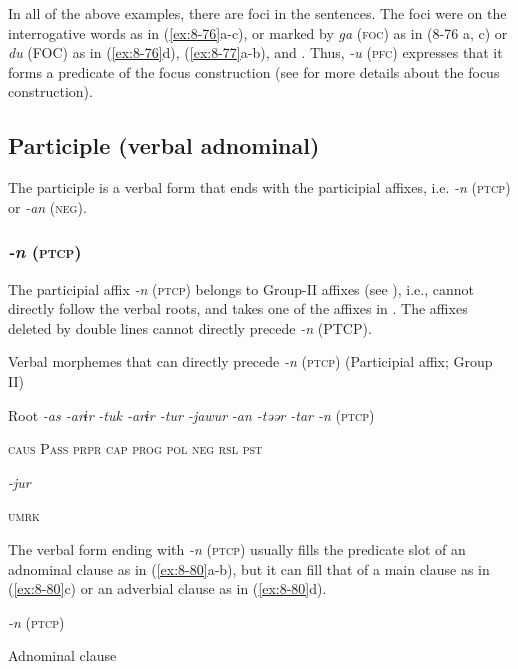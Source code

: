   In all of the above examples, there are foci in the sentences. The foci were on the interrogative words as in (\ref{ex:8-76}a-c), or marked by \textit{ga} (\textsc{foc}) as in (8-76 a, c) or \textit{du} (FOC) as in (\ref{ex:8-76}d), (\ref{ex:8-77}a-b), and . Thus, \textit{{}-u} (\textsc{pfc}) expresses that it forms a predicate of the focus construction (see  for more details about the focus construction).

\subsection{Participle (verbal adnominal)}

The participle is a verbal form that ends with the participial affixes, i.e. \textit{{}-n} (\textsc{ptcp}) or \textit{{}-an} (\textsc{neg}).

\subsubsection{\textit{{}-n} (\textsc{ptcp})}

The participial affix \textit{{}-n} (\textsc{ptcp}) belongs to Group-II affixes (see ), i.e., cannot directly follow the verbal roots, and takes one of the affixes in . The affixes deleted by double lines cannot directly precede \textit{{}-n} (PTCP).

\ea\label{ex:8-79}
  Verbal morphemes that can directly precede \textit{{}-n} (\textsc{ptcp}) (Participial affix; Group II)

  Root  \textit{{}-as  {}-arɨr} %
\textit{{}-tuk  {}-arɨr  {}-tur  {}-jawur} %
\textit{{}-an  {}-təər  {}-tar  {}-n} (\textsc{ptcp})

    \textsc{caus}  P\textsc{ass}  \textsc{prpr}  \textsc{cap}  \textsc{prog}  \textsc{pol}  \textsc{neg}  \textsc{rsl}  \textsc{pst}

          \textit{{}-jur} 

          \textsc{umrk}

The verbal form ending with \textit{{}-n} (\textsc{ptcp}) usually fills the predicate slot of an adnominal clause as in (\ref{ex:8-80}a-b), but it can fill that of a main clause as in (\ref{ex:8-80}c) or an adverbial clause as in (\ref{ex:8-80}d).

\ea\label{ex:8-80}
  \textit{{}-n} (\textsc{ptcp})

  Adnominal clause

